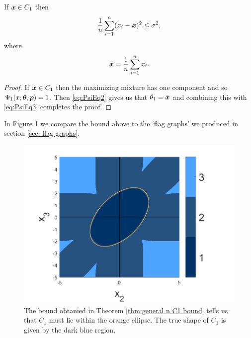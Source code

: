 	\begin{theorem}
		\label{thm:general n C1 bound}
		If ${\bm{{x}}} \in C_1$ then 
		\begin{equation}
			\frac{1}{n} \sum_{i=1}^n (x_i - \bar{{\bm{{x}}}})^2 \leq \sigma^2,
		\end{equation}
		where 
		\begin{equation}
			\bar{{\bm{{x}}}} = \frac{1}{n}\sum_{i = 1}^n x_i.
		\end{equation}
	\end{theorem}
	\begin{proof}
		If ${\bm{{x}}} \in C_1$ then the maximizing mixture has one component and so $\Psi_1(x; {\bm{{\theta}}}, {\bm{{p}}}) = 1$. Then \eqref{eq:PsiEq2} gives us that $\theta_1 = \bar{{\bm{{x}}}}$ and combining this with \eqref{eq:PsiEq3} completes the proof.
	\end{proof}
	In Figure \ref{fig:flag graph m1 bound} we compare the bound above to the `flag graphs' we produced in section \ref{sec: flag graphs}.

	\begin{figure}
		\centering
		\includegraphics[width = \textwidth]{Figures/Mixtures/normal_flag_graph_m1_bound.png}
		\caption{The bound obtanied in Theorem \ref{thm:general n C1 bound} tells us that $C_1$ must lie within the orange ellipse. The true shape of $C_1$ is given by the dark blue region.}
		\label{fig:flag graph m1 bound}
	\end{figure}


